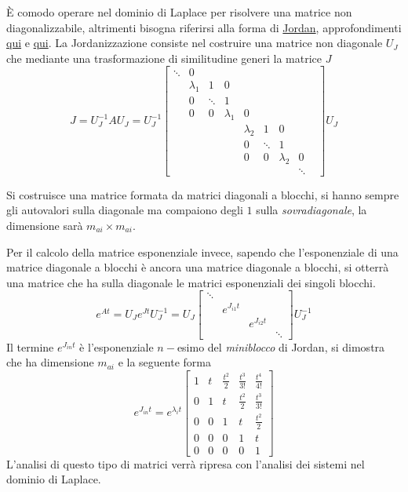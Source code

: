 È comodo operare nel dominio di Laplace per risolvere una matrice non
diagonalizzabile, altrimenti bisogna riferirsi alla forma di
\href{https://it.wikipedia.org/wiki/Forma_canonica_di_Jordan}{Jordan},
approfondimenti
\href{https://youtu.be/mD4zrWkgy0o?list=PL6Tz-CNThN13TMpt6jGje3vbOv0rzKWS7&t=
3199}{qui} e
\href{https://youtu.be/XrnbTxP010I?list=PL6Tz-CNThN13TMpt6jGje3vbOv0rzKWS7}
{qui}.
La Jordanizzazione consiste nel costruire una matrice non diagonale $U_J$ che
mediante una trasformazione di similitudine generi la matrice $J$
$$ J = U_J^{-1}AU_J =U_J^{-1}
\begin{bmatrix}
\ddots & 0 & & & \\
 & \lambda_1 & 1 & 0 & & & &\\
 & 0 & \ddots & 1 &  & & \\
 & 0 & 0 & \lambda_1 & 0 & \\
 & & & & \lambda_2 & 1 & 0 \\
 & & & & 0& \ddots & 1 \\
 & & & & 0 & 0 & \lambda_2 & 0 &\\
 & & & & & &  & \ddots
\end{bmatrix}U_J
$$

Si costruisce una matrice formata da matrici diagonali a blocchi, si hanno
sempre gli autovalori sulla diagonale ma compaiono degli $1$ sulla
\textit{sovradiagonale}, la dimensione sarà $m_{ai}\times m_{ai}$.

Per il calcolo della matrice esponenziale invece, sapendo che l'esponenziale di
una matrice diagonale a blocchi è ancora una matrice diagonale a blocchi, si
otterrà una matrice che ha sulla diagonale le matrici esponenziali dei singoli
blocchi.
$$
e^{At} = U_Je^{Jt}U_J^{-1} = U_J\begin{bmatrix}
\ddots & \\
& e^{J_{i1} t}\\
& & e^{J_{i2} t} \\
& & & \ddots
\end{bmatrix}U_J^{-1}
$$
Il termine $e^{J_{in}t}$ è l'esponenziale $n-$esimo del \textit{miniblocco} di
Jordan, si dimostra che ha dimensione $m_{ai}$ e la seguente forma
$$
e^{J_{in} t} =e^{\lambda_i t} \begin{bmatrix}
1 & t & \frac{t^2}{2} & \frac{t^3}{3!} & \frac{t^4}{4!} \\
0 & 1 & t & \frac{t^2}{2} & \frac{t^3}{3!}  \\
0 & 0 & 1 & t & \frac{t^2}{2} \\
0 & 0 & 0 & 1 & t  \\
0 & 0 & 0 & 0 & 1
\end{bmatrix}
$$
L'analisi di questo tipo di matrici verrà ripresa con l'analisi dei sistemi nel
dominio di Laplace.

